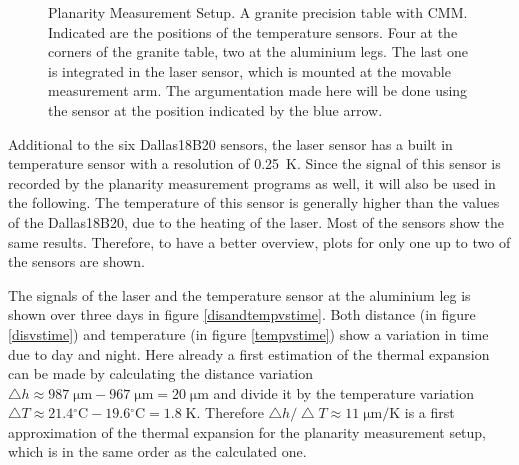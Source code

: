\documentclass[
a4paper,                                %
twoside,                                %
BCOR1.4cm,                      %
10pt,                           %
headings=normal,                %
headsepline,                    %
clearplainpage, %
final,                                  %
div=14,
parskip=full,
openright,
bibliography=toc
]{scrreprt}
\begin{document}
\begin{figure}[H]
	\caption{Planarity Measurement Setup. A granite precision table with CMM. Indicated are the positions of the temperature sensors. Four at the corners of the granite table, two at the aluminium legs. The last one is integrated in the laser sensor, which is mounted at the movable measurement arm. The argumentation made here will be done using the sensor at the position indicated by the blue arrow.}
	\label{sensorpositions}
\end{figure}

Additional to the six Dallas18B20 sensors, the laser sensor has a built in temperature sensor with a resolution of \SI{0.25}{K}. Since the signal of this sensor is recorded by the planarity measurement programs as well, it will also be used in the following. The temperature of this sensor is generally higher than the values of the Dallas18B20, due to the heating of the laser. Most of the sensors show the same results. Therefore, to have a better overview, plots for only one up to two of the sensors are shown.

The signals of the laser and the temperature sensor at the aluminium leg is shown over three days in figure \ref{disandtempvstime}. Both distance (in figure \ref*{disvstime}) and temperature (in figure \ref*{tempvstime}) show a variation in time due to day and night. Here already a first estimation of the thermal expansion can be made by calculating the distance variation $ \bigtriangleup\!h \approx 987\;\mathrm{\mu m} - 967\;\mathrm{\mu m} = 20\;\mathrm{\mu m} $ and divide it by the temperature variation $ \bigtriangleup\!T \approx 21.4 \mathrm{^\circ C} - 19.6 \mathrm{^\circ C} = 1.8\;\mathrm{K} $. Therefore $ \bigtriangleup\!h / \bigtriangleup\!T \approx 11\;\mathrm{\mu m / K}  $ is a first approximation of the thermal expansion for the planarity measurement setup, which is in the same order as the calculated one.
\end{document}
